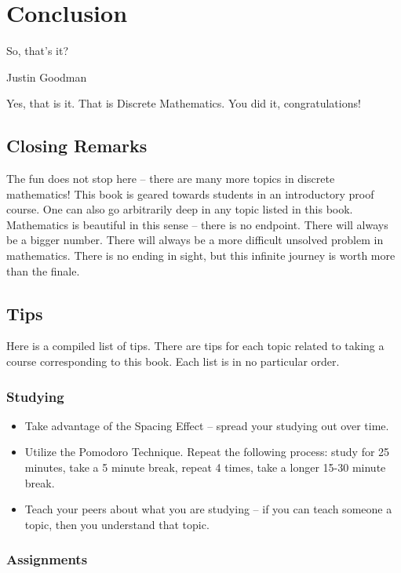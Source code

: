 \documentclass[main.tex]{subfiles}
\begin{document}
\chapter{Conclusion}

\epigraph{So, that's it?}{Justin Goodman}

Yes, that is it. That is Discrete Mathematics. You did it, congratulations!

\section{Closing Remarks}

The fun does not stop here -- there are many more topics in discrete mathematics! This book is geared towards students in an introductory proof course. One can also go arbitrarily deep in any topic listed in this book. Mathematics is beautiful in this sense -- there is no endpoint. There will always be a bigger number. There will always be a more difficult unsolved problem in mathematics. There is no ending in sight, but this infinite journey is worth more than the finale.

\section{Tips}

Here is a compiled list of tips. There are tips for each topic related to taking a course corresponding to this book. Each list is in no particular order.

\subsection{Studying}

\begin{itemize} %
	\item Take advantage of the Spacing Effect -- spread your studying out over time.
	\item Utilize the Pomodoro Technique. Repeat the following process: study for 25 minutes, take a 5 minute break, repeat 4 times, take a longer 15-30 minute break.
	\item Teach your peers about what you are studying -- if you can teach someone a topic, then you understand that topic.
\end{itemize}

\subsection{Assignments}
\end{document}
